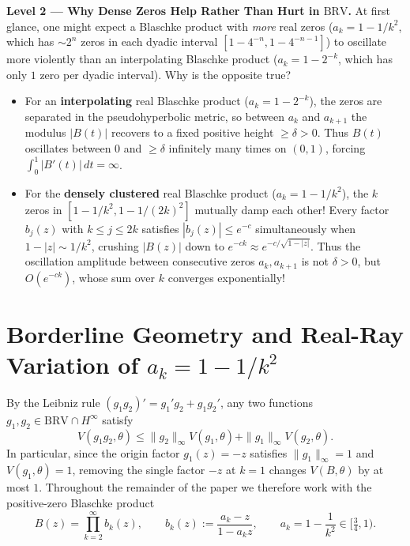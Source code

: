 \documentclass[11pt,reqno]{amsart}
\numberwithin{equation}{section}
\newcommand{\BRV}{\mathrm{BRV}}
\begin{document}
\begin{leveltwo}
\noindent\textbf{\textcolor{l2border}{Level 2 --- Why Dense Zeros Help Rather Than Hurt in $\BRV$.}}
At first glance, one might expect a Blaschke product with \emph{more} real zeros ($a_k = 1 - 1/k^2$, which has $\sim 2^n$ zeros in each dyadic interval $[1 - 4^{-n}, 1 - 4^{-n-1}]$) to oscillate more violently than an interpolating Blaschke product ($a_k = 1 - 2^{-k}$, which has only $1$ zero per dyadic interval). Why is the opposite true?
\begin{itemize}
\item For an \textbf{interpolating} real Blaschke product ($a_k = 1 - 2^{-k}$), the zeros are separated in the pseudohyperbolic metric, so between $a_k$ and $a_{k+1}$ the modulus $|B(t)|$ recovers to a fixed positive height $\ge \delta > 0$. Thus $B(t)$ oscillates between $0$ and $\ge \delta$ infinitely many times on $(0, 1)$, forcing $\int_0^1 |B'(t)|\,dt = \infty$.
\item For the \textbf{densely clustered} real Blaschke product ($a_k = 1 - 1/k^2$), the $k$ zeros in $[1 - 1/k^2, 1 - 1/(2k)^2]$ mutually damp each other! Every factor $b_j(z)$ with $k \le j \le 2k$ satisfies $|b_j(z)| \le e^{-c}$ simultaneously when $1 - |z| \sim 1/k^2$, crushing $|B(z)|$ down to $e^{-c k} \approx e^{-c / \sqrt{1 - |z|}}$. Thus the oscillation amplitude between consecutive zeros $a_k, a_{k+1}$ is not $\delta > 0$, but $O(e^{-c k})$, whose sum over $k$ converges exponentially!
\end{itemize}
\end{leveltwo}

\section{Borderline Geometry and Real-Ray Variation of $a_k = 1 - 1/k^2$} \label{sec_borderline}

By the Leibniz rule $(g_1 g_2)' = g_1' g_2 + g_1 g_2'$, any two functions $g_1, g_2 \in \BRV \cap H^\infty$ satisfy
\begin{equation} \label{eq_brv_algebra}
  V(g_1 g_2, \theta) \le \|g_2\|_\infty V(g_1, \theta) + \|g_1\|_\infty V(g_2, \theta).
\end{equation}
In particular, since the origin factor $g_1(z) = -z$ satisfies $\|g_1\|_\infty = 1$ and $V(g_1, \theta) = 1$, removing the single factor $-z$ at $k = 1$ changes $V(B, \theta)$ by at most $1$. Throughout the remainder of the paper we therefore work with the positive-zero Blaschke product
\begin{equation} \label{eq_B_tail}
  B(z) = \prod_{k=2}^\infty b_k(z), \qquad b_k(z) := \frac{a_k - z}{1 - a_k z}, \qquad a_k = 1 - \frac{1}{k^2} \in \bigl[\tfrac{3}{4}, 1\bigr).
\end{equation}
\end{document}
